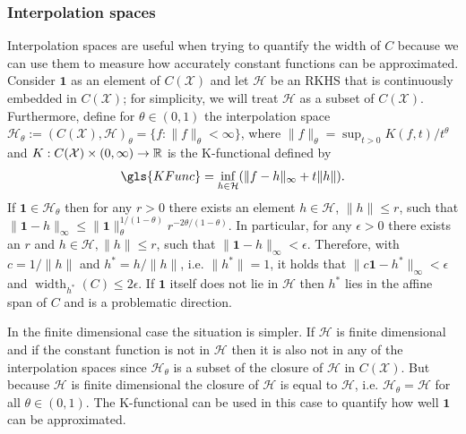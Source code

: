 \documentclass[AHL,Unicode,longabstracts,published]{cedram}
\theoremstyle{remark}
\DeclareMathOperator{\diame}{width}
\newcommand{\R}{\mathbb{R}}
\newcommand{\X}{\mathcal{X}}
\newcommand{\cH}{\mathcal{H}}
\renewcommand*{\to}{\mathchoice{\longrightarrow}{\rightarrow}{\rightarrow}{\rightarrow}}
\begin{document}
\subsubsection{Interpolation spaces} \label{sec:interpol}
Interpolation spaces are useful when trying to quantify the width of $C$ because we can use them to measure how accurately constant functions can be approximated. Consider $\bm 1$ as an element of $C(\X)$ and let $\cH$ be an RKHS that is continuously embedded in $C(\X)$; for simplicity, we will treat $\cH$ as a subset of $C(\X)$. Furthermore, define for $\theta \in (0,1)$ the interpolation space $\cH_\theta:= (C(\X),\cH)_\theta = \{f : \|f\|_\theta < \infty \}$, where $\|f\|_{\theta} = \sup_{t > 0} K(f,t)/t^\theta$ and $K:C(\X) \times (0,\infty)\to \R$ is the K-functional defined by
\[
\gls{KFunc} = \inf_{h\in \cH}(\|f- h\|_\infty + t \|h\|).
\]
If $\bm 1 \in \cH_\theta$ then for any $r>0$ there exists an element $h\in \cH$, $\|h\| \leq r$, such that $\|\bm 1 - h\|_{\infty} \leq \|\bm 1\|_\theta^{1/(1-\theta)} r^{-2\theta/(1-\theta)}$. In particular, for any $\epsilon >0$ there exists an $r$ and $h\in\cH, \|h\|\leq r$, such that $\|\bm 1 - h\|_\infty < \epsilon$. Therefore, with $c = 1/\|h\|$ and $h^* = h/\|h\|$, i.e. $\|h^*\|=1$, it holds that $\|c \bm 1 - h^*\|_\infty < \epsilon$ and $\diame_{h^*}(C) \leq 2 \epsilon$. If $\bm 1$ itself does not lie in $\cH$ then $h^*$ lies in the affine span of $C$ and is a problematic direction.

In the finite dimensional case the situation is simpler. If $\cH$ is finite dimensional and if the constant function is not in $\cH$ then it is also not in any of the interpolation spaces since $\cH_\theta$ is a subset of the closure of $\cH$ in $C(\X)$. But because $\cH$ is finite dimensional the closure of $\cH$ is equal to $\cH$, i.e. $\cH_\theta = \cH$ for all $\theta \in (0,1)$. The K-functional can be used in this case to quantify how well $\bm 1$ can be approximated.
\end{document}
